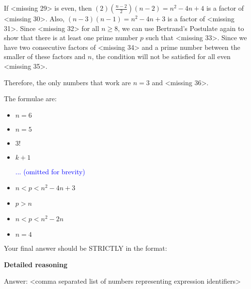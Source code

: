 \begin{tcolorbox}[breakable, title=Representative example of Olympiad task from LiveBench MATH]
If <missing 29> is even, then $(2)(\frac{n-2}{2})(n-2)=n^2-4n+4$ is a factor of <missing 30>. Also, $(n-3)(n-1)=n^2-4n+3$ is a factor of <missing 31>. Since <missing 32> for all $n\geq8$, we can use Bertrand's Postulate again to show that there is at least one prime number $p$ such that <missing 33>. Since we have two consecutive factors of <missing 34> and a prime number between the smaller of these factors and $n$, the condition will not be satisfied for all even <missing 35>.

Therefore, the only numbers that work are $n=3$ and <missing 36>.

The formulae are:
\begin{itemize}
    \item <expression 1> $n=6$ 
    \item <expression 2> $n=5$ 
    \item <expression 3> $3!$ 
    \item <expression 4> $k+1$ 
    
    \textcolor{blue}{... (omitted for brevity)}
    
    \item <expression 33> $n<p<n^2-4n+3$ 
    \item <expression 34> $p>n$ 
    \item <expression 35> $n<p<n^2-2n$ 
    \item <expression 36> $n=4$ 
\end{itemize}

Your final answer should be STRICTLY in the format:

\textbf{Detailed reasoning}

Answer: <comma separated list of numbers representing expression identifiers>

\end{tcolorbox}
